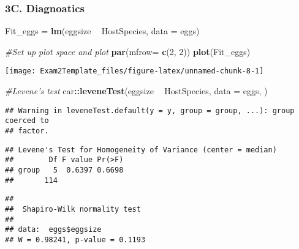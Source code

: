 \documentclass[]{article}
\newenvironment{Shaded}{\begin{snugshade}}{\end{snugshade}}
\newcommand{\CommentTok}[1]{\textcolor[rgb]{0.56,0.35,0.01}{\textit{#1}}}
\newcommand{\DataTypeTok}[1]{\textcolor[rgb]{0.13,0.29,0.53}{#1}}
\newcommand{\DecValTok}[1]{\textcolor[rgb]{0.00,0.00,0.81}{#1}}
\newcommand{\KeywordTok}[1]{\textcolor[rgb]{0.13,0.29,0.53}{\textbf{#1}}}
\newcommand{\NormalTok}[1]{#1}
\newcommand{\OperatorTok}[1]{\textcolor[rgb]{0.81,0.36,0.00}{\textbf{#1}}}
\newcommand{\StringTok}[1]{\textcolor[rgb]{0.31,0.60,0.02}{#1}}
\begin{document}
\hypertarget{c.-diagnoatics}{%
\subsubsection{3C. Diagnoatics}\label{c.-diagnoatics}}

\begin{Shaded}
\begin{Highlighting}[]
\NormalTok{Fit_eggs =}\StringTok{ }\KeywordTok{lm}\NormalTok{(eggsize }\OperatorTok{~}\StringTok{ }\NormalTok{HostSpecies, }\DataTypeTok{data =}\NormalTok{ eggs)}

\CommentTok{#Set up plot space and plot}
\KeywordTok{par}\NormalTok{(}\DataTypeTok{mfrow=} \KeywordTok{c}\NormalTok{(}\DecValTok{2}\NormalTok{, }\DecValTok{2}\NormalTok{))}
\KeywordTok{plot}\NormalTok{(Fit_eggs)}
\end{Highlighting}
\end{Shaded}

\texttt{[image: Exam2Template\_files/figure-latex/unnamed-chunk-8-1]}

\begin{Shaded}
\begin{Highlighting}[]
\CommentTok{#Levene's test}
\NormalTok{car}\OperatorTok{::}\KeywordTok{leveneTest}\NormalTok{(eggsize }\OperatorTok{~}\StringTok{ }\NormalTok{HostSpecies, }\DataTypeTok{data =}\NormalTok{ eggs, )}
\end{Highlighting}
\end{Shaded}

\begin{verbatim}
## Warning in leveneTest.default(y = y, group = group, ...): group coerced to
## factor.
\end{verbatim}

\begin{verbatim}
## Levene's Test for Homogeneity of Variance (center = median)
##        Df F value Pr(>F)
## group   5  0.6397 0.6698
##       114
\end{verbatim}

\begin{Shaded}
\end{Shaded}

\begin{verbatim}
## 
##  Shapiro-Wilk normality test
## 
## data:  eggs$eggsize
## W = 0.98241, p-value = 0.1193
\end{verbatim}
\end{document}
